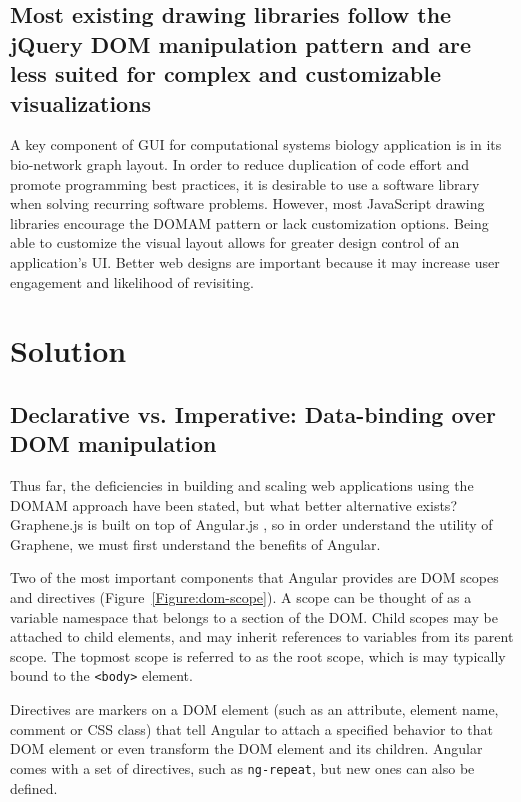 \subsection{Most existing drawing libraries follow the jQuery DOM manipulation pattern and are less suited for complex and customizable visualizations}
A key component of GUI for computational systems biology application is in its bio-network graph layout.
In order to reduce duplication of code effort and promote programming best practices, it is desirable to use a software library when solving recurring software problems.
However, most JavaScript drawing libraries encourage the DOMAM pattern or lack customization options.
Being able to customize the visual layout allows for greater design control of an application's UI. 
Better web designs are important because it may increase user engagement and likelihood of revisiting. \autocite{rosen2004website}


\section{Solution}

\subsection{Declarative vs. Imperative: Data-binding over DOM manipulation}
\label{sec:declarative-vs-imperative}

Thus far, the deficiencies in building and scaling web applications using the DOMAM approach have been stated, but what better alternative exists?
Graphene.js is built on top of Angular.js \autocite{google2014angular}, so in order understand the utility of Graphene, we must first understand the benefits of Angular.

Two of the most important components that Angular provides are DOM scopes and directives (Figure~\ref{Figure:dom-scope}).
A scope can be thought of as a variable namespace that belongs to a section of the DOM.
Child scopes may be attached to child elements, and may inherit references to variables from its parent scope.
The topmost scope is referred to as the root scope, which is may typically bound to the \texttt{<body>} element.

Directives are markers on a DOM element (such as an attribute, element name, comment or CSS class) that tell Angular to attach a specified behavior to that DOM element or even transform the DOM element and its children. \autocite{google2014angularDirectives, google2014angulardirectives2}
Angular comes with a set of directives, such as \texttt{ng-repeat}, but new ones can also be defined.

